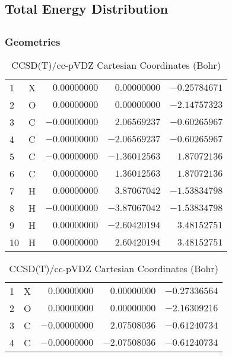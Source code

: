 \documentclass[10pt,oneside]{article}
\begin{document}
\begin{table}
\subsection*{Total Energy Distribution}
\centering\end{table}

\clearpage

\subsection{}

\begin{table}[h!]
\subsubsection*{Geometries}
\begin{multicols}{2}
\centering
\caption{CCSD(T)/cc-pVTZ Cartesian Coordinates (Bohr)}
\begin{tabular}{llrrr}
\toprule
1  & X  & $ 0.00000000$ & $ 0.00000000$ & $-0.25784671$ \\
2  & O  & $ 0.00000000$ & $ 0.00000000$ & $-2.14757323$ \\
3  & C  & $-0.00000000$ & $ 2.06569237$ & $-0.60265967$ \\
4  & C  & $-0.00000000$ & $-2.06569237$ & $-0.60265967$ \\
5  & C  & $-0.00000000$ & $-1.36012563$ & $ 1.87072136$ \\
6  & C  & $ 0.00000000$ & $ 1.36012563$ & $ 1.87072136$ \\
7  & H  & $ 0.00000000$ & $ 3.87067042$ & $-1.53834798$ \\
8  & H  & $-0.00000000$ & $-3.87067042$ & $-1.53834798$ \\
9  & H  & $ 0.00000000$ & $-2.60420194$ & $ 3.48152751$ \\
10 & H  & $ 0.00000000$ & $ 2.60420194$ & $ 3.48152751$ \\
\bottomrule
\end{tabular}
\caption{CCSD(T)/cc-pVDZ Cartesian Coordinates (Bohr)}
\begin{tabular}{llrrr}
\toprule
1  & X  & $ 0.00000000$ & $ 0.00000000$ & $-0.27336564$ \\
2  & O  & $ 0.00000000$ & $ 0.00000000$ & $-2.16309216$ \\
3  & C  & $-0.00000000$ & $ 2.07508036$ & $-0.61240734$ \\
4  & C  & $-0.00000000$ & $-2.07508036$ & $-0.61240734$ \\

\end{tabular}
\end{multicols}
\end{table}
\end{document}
